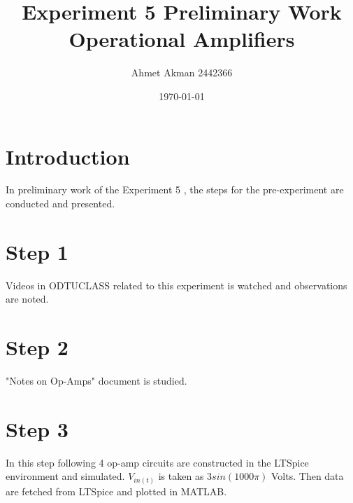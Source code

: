 \documentclass[letterpaper,12pt]{article}
\begin{document}
\title{Experiment 5 Preliminary Work \protect\\ Operational Amplifiers}
\author{Ahmet Akman 2442366 \protect\\}
\date{\today}
\maketitle


\section{Introduction} 
In preliminary work of the Experiment 5 , the steps for the pre-experiment are conducted and presented.
\section{Step 1}
Videos in  ODTUCLASS related to this experiment is watched and observations are noted.
\section{Step 2}
"Notes on Op-Amps" document is studied.
\section{Step 3}
In this step following 4 op-amp circuits are constructed in the LTSpice environment and simulated. \(V_{in (t)}\) is taken as \(3sin(1000\pi)\) Volts. Then data are fetched from LTSpice and plotted in MATLAB.
\end{document}
